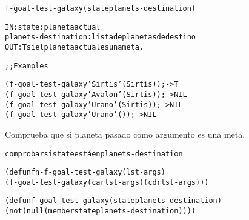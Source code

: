 \begin{aibox}{\function}
\begin{alltt}
f-goal-test-galaxy (state planets-destination) 


IN: 	state: planeta actual
		planets-destination: lista de planetas de destino
OUT: T si el planeta actual es una meta.

\end{alltt}
\end{aibox}

\begin{aibox}{\examples}
\begin{alltt}
;; Examples

(f-goal-test-galaxy 'Sirtis '(Sirtis)) ;-> T 
(f-goal-test-galaxy 'Avalon '(Sirtis)) ;-> NIL 
(f-goal-test-galaxy 'Urano '(Sirtis)) ;-> NIL
(f-goal-test-galaxy 'Urano '()) ;-> NIL


\end{alltt}
\end{aibox}

\begin{aibox}{\comments}
Comprueba que si planeta pasado como argumento es una meta.

\end{aibox}

\begin{aibox}{\pseudocode}
\begin{alltt}

comprobar si state está en planets-destination

\end{alltt}
\end{aibox}

\begin{aibox}{\code}
\begin{alltt}
(defun fn-f-goal-test-galaxy (lst-args)
	(f-goal-test-galaxy (car lst-args) (cdr lst-args)))

(defun f-goal-test-galaxy (state planets-destination) 
  (not (null (member state planets-destination))))





\end{alltt}
\end{aibox}

